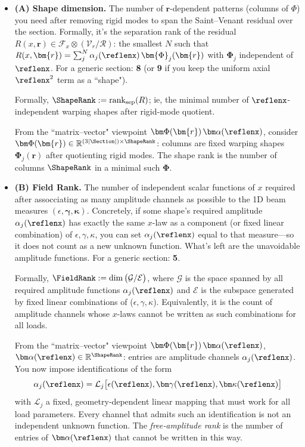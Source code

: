

\begin{itemize}
\item \textbf{(A) Shape dimension.}
  The number of \(\bm{r}\)-dependent patterns (columns of \(\Phi\)) you need after removing rigid modes to span the Saint–Venant residual over the section. 
  Formally, it’s the separation rank of the residual \(R(x,\bm{r})\in \mathcal F_x\otimes(\mathcal V_r/\mathscr R)\): the smallest \(N\) such that
  \(R(x,\bm{r})=\sum_{j}^N \alpha_j(\reflenx)\,\bm{\Phi}_j(\bm{r})\) with \(\bm{\Phi}_j\) independent of \(\reflenx\).
  For a generic section: \textbf{8} (or \textbf{9} if you keep the uniform axial \(\reflenx^2\) term as a ``shape").

  Formally, \(\ShapeRank := \operatorname{rank}_{\text{sep}}(R)\); ie, the minimal number of \(\reflenx\)-independent warping shapes after rigid‑mode quotient.

  From the ``matrix–vector" viewpoint \(\bm\Phi(\bm{r})\,\bm\alpha(\reflenx)\), consider \(\bm\Phi(\bm{r})\in\mathbb R^{(3|\Section|)\times \ShapeRank}\): columns are fixed warping shapes \(\bm{\Phi}_j(\bm{r})\) after quotienting rigid modes.
  The shape rank is the number of columns \(\ShapeRank\) in a minimal such \(\bm\Phi\).

\item \textbf{(B) Field Rank.}
  The number of independent scalar functions of \(x\) required after assocciating as many amplitude channels as possible to the 1D beam measures \((\epsilon,\bm\gamma,\bm\kappa)\). 
  Concretely, if some shape’s required amplitude \(\alpha_j(\reflenx)\) has exactly the same \(x\)-law as a component (or fixed linear combination) of \(\epsilon,\gamma,\kappa\), you can set \(\alpha_j(\reflenx)\) equal to that measure—so it does not count as a new unknown function. 
  What’s left are the unavoidable amplitude functions. For a generic section: \textbf{5}.

  Formally, \(\FieldRank := \dim\big(\mathcal G/\mathcal E\big)\), where \(\mathcal G\) is the space spanned by all required amplitude functions \(\alpha_j(\reflenx)\) and \(\mathcal E\) is the subspace generated by fixed linear combinations of (\(\epsilon,\gamma,\kappa\)). 
  Equivalently, it is the count of amplitude channels whose \(x\)-laws cannot be written as such combinations for all loads.
  
From the ``matrix–vector" viewpoint \(\bm\Phi(\bm{r})\,\bm\alpha(\reflenx)\),  \(\bm\alpha(\reflenx)\in \mathbb R^\ShapeRank\): entries are amplitude channels \(\alpha_j(\reflenx)\).
  You now impose identifications of the form
  \[
  \alpha_j(\reflenx)=\mathcal L_j\big[\epsilon(\reflenx),\bm\gamma(\reflenx),\bm\kappa(\reflenx)\big]
  \]
  with \(\mathcal L_j\) a fixed, geometry‑dependent linear mapping that must work for all load parameters. Every channel that admits such an identification is not an independent unknown function. 
  The \emph{free‑amplitude rank} is the number of entries of \(\bm\alpha(\reflenx)\) that cannot be written in this way.

\end{itemize}

